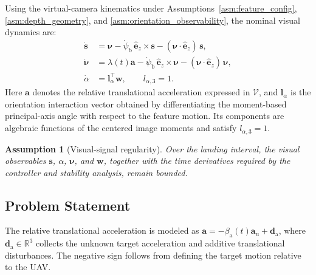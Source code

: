 \documentclass[10pt,conference]{IEEEtran}
\newtheorem{assumption}{Assumption}
\begin{document}
Using the virtual-camera kinematics under Assumptions~\ref{asm:feature_config},
\ref{asm:depth_geometry}, and \ref{asm:orientation_observability}, the nominal visual dynamics are:
\begin{equation} \label{visual dynamics: equation}
    \begin{aligned}
    \dot{\boldsymbol{s}} &= \boldsymbol{\nu} - \dot{\psi}_\text{b}\,\hat{\boldsymbol{e}}_z\times\boldsymbol{s} - (\boldsymbol{\nu}\cdot\hat{\boldsymbol{e}}_z)\,\boldsymbol{s}, \\
    \dot{\boldsymbol{\nu}} &= \lambda(t)\boldsymbol{a} - \dot{\psi}_\text{b}\,\hat{\boldsymbol{e}}_z\times\boldsymbol{\nu} - (\boldsymbol{\nu}\cdot\hat{\boldsymbol{e}}_z)\,\boldsymbol{\nu}, \\
    \dot{\alpha} &= \boldsymbol l_\alpha^\top\boldsymbol w, \qquad l_{\alpha,3}=1.
    \end{aligned}
\end{equation}
Here $\boldsymbol{a}$ denotes the relative translational acceleration expressed in $\mathcal{V}$, and $\boldsymbol l_\alpha$ is the orientation interaction vector obtained by differentiating the moment-based principal-axis angle with respect to the feature motion. Its components are algebraic functions of the centered image moments and satisfy $l_{\alpha,3}=1$.

\begin{assumption}[Visual-signal regularity]
\label{asm:visual_regularity}
Over the landing interval, the visual observables $\boldsymbol s$, $\alpha$, $\boldsymbol\nu$, and $\boldsymbol w$, together with the time derivatives required by the controller and stability analysis, remain bounded.
\end{assumption}

\subsection{Problem Statement}
\label{subsec:problem_statement}
The relative translational acceleration is modeled as $\boldsymbol{a} = -\beta_{\mathrm{a}}(t)\boldsymbol{a}_{\mathrm{u}} + \boldsymbol{d}_{\mathrm{a}}$, where $\boldsymbol{d}_{\mathrm{a}}\in\mathbb{R}^{3}$ collects the unknown target acceleration and additive translational disturbances. The negative sign follows from defining the target motion relative to the UAV.
\end{document}
